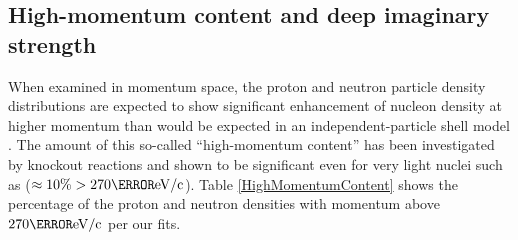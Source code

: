 \subsection{High-momentum content and deep imaginary strength}
When examined in momentum space, the proton and neutron particle density distributions
are expected to show significant enhancement of nucleon density at higher momentum
than would be expected in an independent-particle shell model
\cite{RoheHabilitation}. The amount of this so-called
``high-momentum content'' has been investigated by knockout reactions
\cite{Rohe2004, RoheHabilitation} and shown to be significant even for very
light nuclei such as \cTwelve ($\approx10\% >
270 \mega\electronvolt/\text{c}$). Table \ref{HighMomentumContent} shows the
percentage of the proton and neutron densities with momentum above $270
\mega\electronvolt/\text{c}$ per our fits.
\begin{table}[tb]
    \caption[High-momentum content extracted from DOM analysis]
    {
        High-momentum content as extracted from DOM analysis. For protons and neutrons for each
        nucleus under study, the nucleon density distribution in momentum-space is calculated and
        the fraction of the density distribution above 270 \mega\electronvolt/c is
        tabulated. For comparison, \cite{Rohe2004} reported $\approx10\%$ high momentum content for
        \cTwelve. The full momentum-space matter distributions for protons and
        neutrons for each nucleus are available in Appendix \ref{DOMVisualization}. 
    }
    \label{HighMomentumContent}
    \centering
    {}
\end{table}
